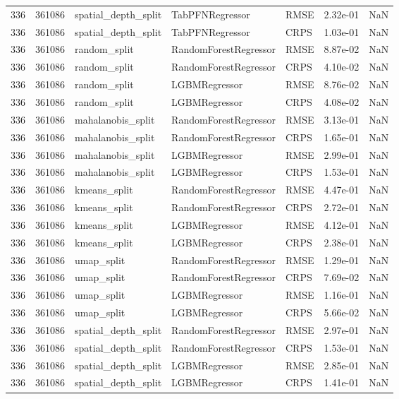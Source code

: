 \begin{tabular}{rrlllrr}
336 & 361086 & spatial\_depth\_split & TabPFNRegressor & RMSE & 2.32e-01 & NaN \\
336 & 361086 & spatial\_depth\_split & TabPFNRegressor & CRPS & 1.03e-01 & NaN \\
336 & 361086 & random\_split & RandomForestRegressor & RMSE & 8.87e-02 & NaN \\
336 & 361086 & random\_split & RandomForestRegressor & CRPS & 4.10e-02 & NaN \\
336 & 361086 & random\_split & LGBMRegressor & RMSE & 8.76e-02 & NaN \\
336 & 361086 & random\_split & LGBMRegressor & CRPS & 4.08e-02 & NaN \\
336 & 361086 & mahalanobis\_split & RandomForestRegressor & RMSE & 3.13e-01 & NaN \\
336 & 361086 & mahalanobis\_split & RandomForestRegressor & CRPS & 1.65e-01 & NaN \\
336 & 361086 & mahalanobis\_split & LGBMRegressor & RMSE & 2.99e-01 & NaN \\
336 & 361086 & mahalanobis\_split & LGBMRegressor & CRPS & 1.53e-01 & NaN \\
336 & 361086 & kmeans\_split & RandomForestRegressor & RMSE & 4.47e-01 & NaN \\
336 & 361086 & kmeans\_split & RandomForestRegressor & CRPS & 2.72e-01 & NaN \\
336 & 361086 & kmeans\_split & LGBMRegressor & RMSE & 4.12e-01 & NaN \\
336 & 361086 & kmeans\_split & LGBMRegressor & CRPS & 2.38e-01 & NaN \\
336 & 361086 & umap\_split & RandomForestRegressor & RMSE & 1.29e-01 & NaN \\
336 & 361086 & umap\_split & RandomForestRegressor & CRPS & 7.69e-02 & NaN \\
336 & 361086 & umap\_split & LGBMRegressor & RMSE & 1.16e-01 & NaN \\
336 & 361086 & umap\_split & LGBMRegressor & CRPS & 5.66e-02 & NaN \\
336 & 361086 & spatial\_depth\_split & RandomForestRegressor & RMSE & 2.97e-01 & NaN \\
336 & 361086 & spatial\_depth\_split & RandomForestRegressor & CRPS & 1.53e-01 & NaN \\
336 & 361086 & spatial\_depth\_split & LGBMRegressor & RMSE & 2.85e-01 & NaN \\
336 & 361086 & spatial\_depth\_split & LGBMRegressor & CRPS & 1.41e-01 & NaN \\

\end{tabular}
